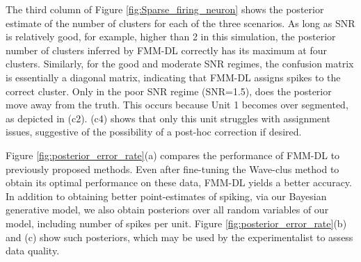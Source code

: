\documentclass[journal]{IEEEtran}
\begin{document}
The third column of Figure \ref{fig:Sparse_firing_neuron} shows the posterior estimate of the number of clusters for each of the three scenarios.  As long as SNR is relatively good, for example, higher than 2 in this simulation, the posterior number of clusters inferred by FMM-DL correctly has its maximum at four clusters.  Similarly, for the good and moderate SNR regimes, the confusion matrix is essentially a diagonal matrix, indicating that FMM-DL assigns spikes to the correct cluster.  Only in the poor SNR regime (SNR=1.5), does the posterior move away from the truth.  This occurs because Unit 1 becomes over segmented, as depicted in (c2).  (c4) shows that only this unit struggles with assignment issues, suggestive of the possibility of a post-hoc correction if desired.

Figure \ref{fig:posterior_error_rate}(a) compares the performance of FMM-DL to previously proposed methods.  Even after fine-tuning the Wave-clus method to obtain its optimal performance on these data, FMM-DL yields a better accuracy.  
In addition to obtaining better point-estimates of spiking, via our Bayesian generative model, we also obtain posteriors over all random variables of our model, including number of spikes per unit.  Figure \ref{fig:posterior_error_rate}(b) and (c) show such posteriors, which may be used by the experimentalist to assess data quality.

\end{document}
